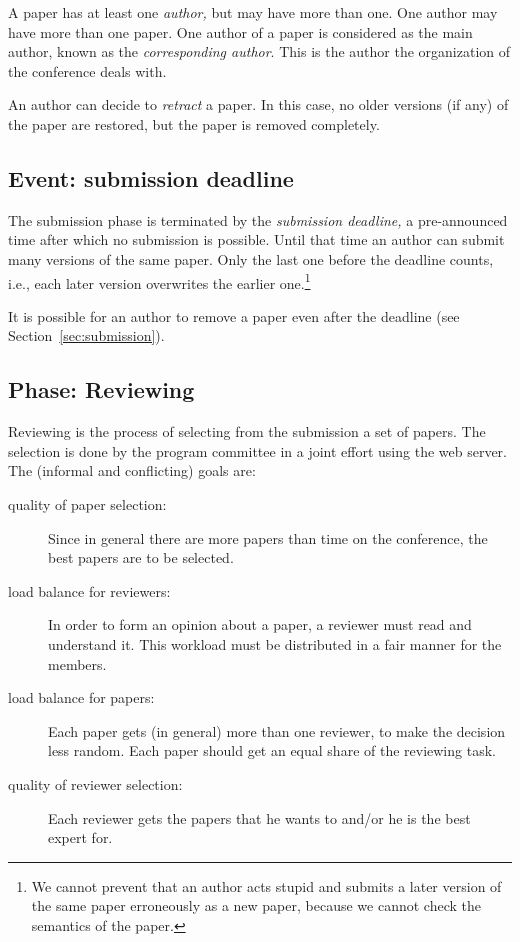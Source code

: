 A paper has at least one \emph{author,} but may have more than one.  One
author may have more than one paper. One author of a paper is considered as
the main author, known as the \emph{corresponding author}. This is the
author the organization of the conference deals with. 

An author can decide to \emph{retract} a paper. In this case, no older
versions (if any) of the paper are restored, but the paper is removed
completely.





\subsection{Event: submission deadline}
\label{sec:deadline}

The submission phase is terminated by the \emph{submission deadline,} a
pre-announced time after which no submission is possible. Until that time
an author can submit many versions of the same paper. Only the last one
before the deadline counts, i.e., each later version overwrites the earlier
one.\footnote{We cannot prevent that an author acts stupid and submits a
  later version of the same paper erroneously as a new paper, because we
  cannot check the semantics of the paper.}

It is possible for an author to remove a paper even after the deadline (see
Section~\ref{sec:submission}).



\subsection{Phase: Reviewing}
\label{sec:reviewing}

Reviewing is the process of selecting from the submission a set of papers.
The selection is done by the program committee in a joint effort using the
web server. The (informal and conflicting) goals are:
\begin{description}
\item[quality of paper selection:] Since in general there are more papers
  than time on the conference, the best papers are to be selected.
\item[load balance for reviewers:] In order to form an opinion about a
  paper, a reviewer must read and understand it.  This workload must be
  distributed in a fair manner for the members.
\item[load balance for papers:] Each paper gets (in general) more than one
  reviewer, to make the decision less random. Each paper should get an
  equal share of the reviewing task.
\item[quality of reviewer selection:] Each reviewer gets the papers that he
  wants to and/or he is the best expert for.
\end{description}

